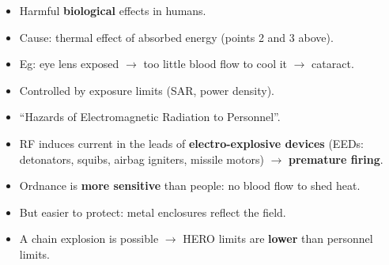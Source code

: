 \par{}
{\color{sub}\footnotesize {}}
\par\noindent
\begin{minipage}[t]{0.31\textwidth}\vspace{0pt}\raggedright
{}
\begin{itemize}
  \item Harmful \textbf{biological} effects in humans.
  \item Cause: thermal effect of absorbed energy (points 2 and 3 above).
  \item Eg: eye lens exposed $\rightarrow$ too little blood flow to cool it $\rightarrow$
    cataract.
  \item Controlled by exposure limits (SAR, power density).
  \item \textcolor{sub}{\small ``Hazards of Electromagnetic Radiation to Personnel''.}
\end{itemize}\end{minipage}\hfill
\begin{minipage}[t]{0.33\textwidth}\vspace{0pt}\raggedright
{}
\begin{itemize}
  \item RF induces current in the leads of \textbf{electro-explosive devices} (EEDs: detonators,
    squibs, airbag igniters, missile motors) $\rightarrow$ \textbf{premature firing}.
  \item Ordnance is \textbf{more sensitive} than people: no blood flow to shed heat.
  \item But easier to protect: metal enclosures reflect the field.
  \item A chain explosion is possible $\rightarrow$ HERO limits are \textbf{lower} than
    personnel limits.
\end{itemize}\end{minipage}\hfill
